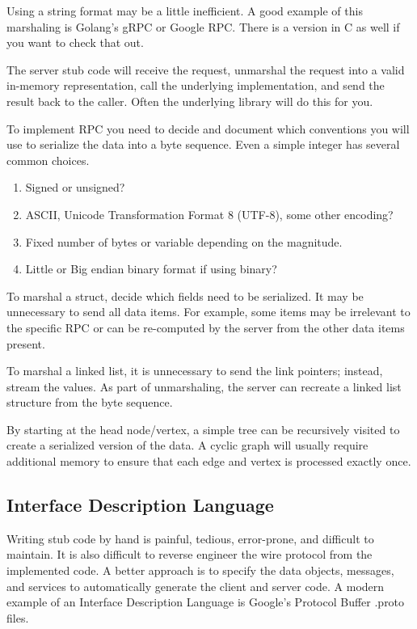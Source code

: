 Using a string format may be a little inefficient.
A good example of this marshaling is Golang's gRPC or Google RPC. There is a version in C as well if you want to check that out.

The server stub code will receive the request, unmarshal the request into a valid in-memory representation, call the underlying implementation, and send the result back to the caller.
Often the underlying library will do this for you.

To implement RPC you need to decide and document which conventions you will use to serialize the data into a byte sequence.
Even a simple integer has several common choices.

\begin{enumerate}
\item Signed or unsigned?
\item ASCII, Unicode Transformation Format 8 (UTF-8), some other encoding?
\item Fixed number of bytes or variable depending on the magnitude.
\item Little or Big endian binary format if using binary?
\end{enumerate}

To marshal a struct, decide which fields need to be serialized.
It may be unnecessary to send all data items.
For example, some items may be irrelevant to the specific RPC or can be re-computed by the server from the other data items present.

To marshal a linked list, it is unnecessary to send the link pointers; instead, stream the values.
As part of unmarshaling, the server can recreate a linked list structure from the byte sequence.

By starting at the head node/vertex, a simple tree can be recursively visited to create a serialized version of the data.
A cyclic graph will usually require additional memory to ensure that each edge and vertex is processed exactly once.

\subsection{Interface Description Language}

Writing stub code by hand is painful, tedious, error-prone, and difficult to maintain.
It is also difficult to reverse engineer the wire protocol from the implemented code.
A better approach is to specify the data objects, messages, and services to automatically generate the client and server code.
A modern example of an Interface Description Language is Google's Protocol Buffer .proto files.

